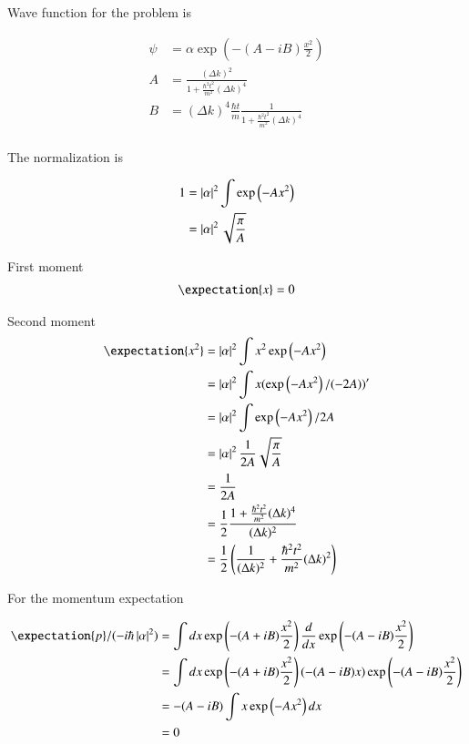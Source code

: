 \documentclass{article}
\begin{document}
Wave function for the problem is

\begin{align*}
\psi &= \alpha \exp\left( -(A - iB) \frac{x^2}{2} \right) \\
A &= \frac{(\Delta k)^2}{ 1 + \frac{\hbar^2 t^2}{m^2}(\Delta k)^4 } \\
B &= (\Delta k)^4 \frac{\hbar t}{m} \frac{1}{ 1 + \frac{\hbar^2 t^2}{m^2}(\Delta k)^4 } \\
\end{align*}

The normalization is

\begin{align*}
1 
&= \left\lvert{\alpha}\right\rvert^2 \int \exp\left( -A {x^2} \right) \\
&= \left\lvert{\alpha}\right\rvert^2 \sqrt{\frac{\pi}{A}}
\end{align*}

First moment
\begin{align*}
\expectation{x} = 0
\end{align*}

Second moment
\begin{align*}
\expectation{x^2} 
&= 
\Abs{\alpha}^2 \int x^2 \exp\left( -A x^2 \right) \\
&= 
\Abs{\alpha}^2 \int x (\exp\left( -A x^2 \right)/(-2A))' \\
&= 
\Abs{\alpha}^2 \int \exp\left( -A x^2 \right)/2A \\
&= 
\Abs{\alpha}^2 \inv{2A} \sqrt{ \frac{\pi}{A}} \\
&= 
\inv{2A} \\
&=
\inv{2} \frac{ 1 + \frac{\hbar^2 t^2}{m^2}(\Delta k)^4 }{(\Delta k)^2}
 \\
&=
\inv{2}\left(\inv{(\Delta k)^2} + \frac{\hbar^2 t^2}{m^2}(\Delta k)^2 \right) \\
\end{align*}

For the momentum expectation

\begin{align*}
\expectation{p}/(-i\hbar\Abs{\alpha}^2) 
&= \int dx
\exp\left( -(A + iB) \frac{x^2}{2} \right) 
\frac{d}{dx}
\exp\left( -(A - iB) \frac{x^2}{2} \right)  \\
&= \int dx
\exp\left( -(A + iB) \frac{x^2}{2} \right) 
(-(A -iB)x)
\exp\left( -(A - iB) \frac{x^2}{2} \right)  \\
&= 
-(A -iB)
\int x \exp\left( -A x^2 \right) dx
\\
&= 0
\end{align*}
\end{document}
